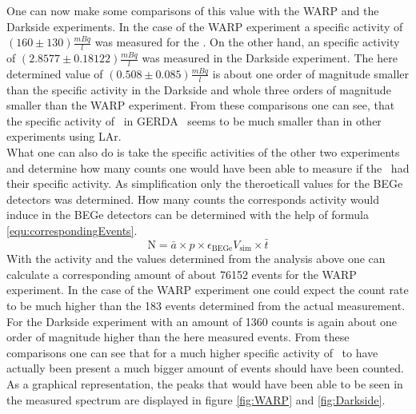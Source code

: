 \documentclass[encoding=utf8,british]{tumphthesis}
\begin{document}
One can now make some comparisons of this value with the WARP and the Darkside experiments.
In the case of the WARP experiment a specific activity of $(160\pm130)\frac{\unit{mBq}}{\unit{l}}$ \label{} was measured for the \Kr.
On the other hand, an specific activity of $(2.8577 \pm 0.18122) \frac{\unit{mBq}}{\unit{l}}$ was measured in the Darkside experiment.
The here determined value of $(0.508\pm0.085)\frac{\unit{mBq}}{\unit{l}}$ is about one order of magnitude smaller than the specific activity in the Darkside and whole three orders of magnitude smaller than the WARP experiment.
From these comparisons one can see, that the specific activity of \Kr\ in GERDA \PII\ seems to be much smaller than in other experiments using LAr.
\\

What one can also do is take the specific activities of the other two experiments and determine how many counts one would have been able to measure if the \Kr\ had their specific activity.
As simplification only the theroeticall values for the BEGe detectors was determined. 
How many counts the corresponds activity would induce in the BEGe detectors can be determined with the help of formula \ref{equ:correspondingEvents}.
\begin{equation}
\mathrm{N} = \bar{a} \times p \times \epsilon_\mathrm{BEGe} V_{\mathrm{sim}} \times \bar{t}
\label{equ:correspondingEvents}
\end{equation}
With the activity and the values determined from the analysis above one can calculate a corresponding amount of about 76152 events for the WARP experiment.
In the case of the WARP experiment one could expect the count rate to be much higher than the 183 events determined from the actual measurement.
For the Darkside experiment with an amount of 1360 counts is again about one order of magnitude higher than the here measured events.
From these comparisons one can see that for a much higher specific activity of \Kr\ to have actually been present a much bigger amount of events should have been counted.
As a graphical representation, the peaks that would have been able to be seen in the measured spectrum are displayed in figure \ref{fig:WARP} and \ref{fig:Darkside}.
\\
\end{document}
